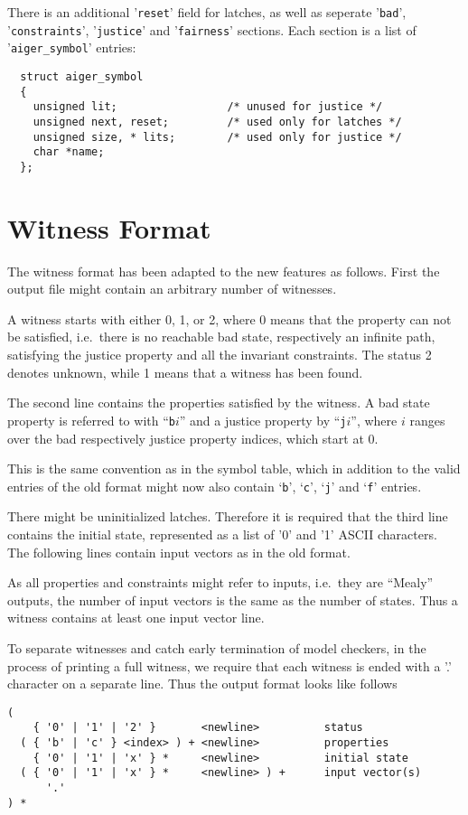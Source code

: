 \documentclass{llncs}
\begin{document}
There is an additional '\texttt{reset}' field for latches, as well as 
seperate '\texttt{bad}', '\texttt{constraints}', '\texttt{justice}' and
'\texttt{fairness}' sections.  Each section
is a list of '\texttt{aiger\_symbol}' entries:

{\small
\begin{verbatim}
  struct aiger_symbol
  {
    unsigned lit;                 /* unused for justice */
    unsigned next, reset;         /* used only for latches */
    unsigned size, * lits;        /* used only for justice */
    char *name;
  };
\end{verbatim}}

\section{Witness Format}

The witness format has been adapted to the new features as follows.
First the output file might contain an arbitrary number of witnesses.

A witness starts with either 0, 1, or 2, where 0 means that the property can
not be satisfied, i.e.~there is no reachable bad state, respectively an
infinite path, satisfying the justice property and all the invariant
constraints.  The status 2 denotes unknown, while 1 means that a witness has
been found.

The second line contains the properties satisfied by the witness.
A bad state property is referred to with ``\texttt{b}$i$'' and a
justice property by ``\texttt{j}$i$'', where $i$ ranges over the bad
respectively justice property indices, which start at 0.

This is the same convention as in the symbol table, which in addition
to the valid entries of the old format might now also contain
`\texttt{b}', `\texttt{c}', `\texttt{j}' and
`\texttt{f}' entries.

There might be uninitialized latches.  Therefore it is required that the third
line contains the initial state, represented as a list of '0' and '1' ASCII
characters.  The following lines contain input vectors as in the old format.

As all properties and constraints might refer to inputs, i.e.~they are ``Mealy''
outputs, the number of input vectors is the same as the number of states.
Thus a witness contains at least one input vector line.

To separate witnesses and catch early termination of model checkers, in the
process of printing a full witness, we require that each witness is
ended with a '.' character on a separate line.
Thus the output format looks like follows
{\small
\begin{verbatim}
(
    { '0' | '1' | '2' }       <newline>          status
  ( { 'b' | 'c' } <index> ) + <newline>          properties
    { '0' | '1' | 'x' } *     <newline>          initial state
  ( { '0' | '1' | 'x' } *     <newline> ) +      input vector(s)
      '.'
) *
\end{verbatim}}
\end{document}
